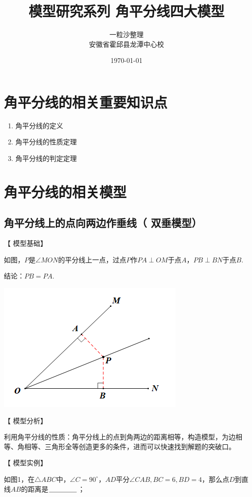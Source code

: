 \documentclass[10pt]{ctexart}
\title{模型研究系列 \quad 角平分线四大模型}
\author{一粒沙整理\\安徽省霍邱县龙潭中心校}
\date{\today}
\begin{document}
\maketitle
\tableofcontents


\section{角平分线的相关重要知识点}
\begin{enumerate}
	\item 角平分线的定义
	\item 角平分线的性质定理
	\item 角平分线的判定定理
\end{enumerate}


\section{角平分线的相关模型}
\subsection[双垂模型]{角平分线上的点向两边作垂线（ 双垂模型）}
【 {\heiti 模型基础}】

如图，$P$是$\angle MON$的平分线上一点，过点$P$作$PA\perp OM $于点$A$，$PB\perp BN $于点$B$.

结论：$PB=PA$.

\begin{flushright}
	\includegraphics[scale=0.6]{figure/jiaopfxian01}
\end{flushright}

【 {\heiti 模型分析}】

利用角平分线的性质：角平分线上的点到角两边的距离相等，构造模型，为边相等、角相等、三角形全等创造更多的条件，进而可以快速找到解题的突破口。

【 {\heiti 模型实例}】
\begin{shaded}
	\begin{example}
	如图1，在$\triangle ABC$中，$\angle C=90^\circ$，$AD$平分$\angle CAB,BC=6,BD=4$，那么点$D$到直线$AB$的距离是$\underline{\hspace{1.5cm}}$；
	\end{example}
\end{shaded}
\end{document}

